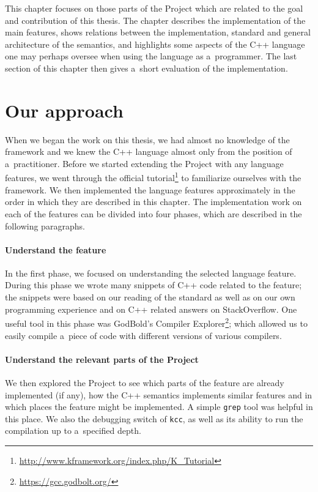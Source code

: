 \documentclass[nolot,nolof,nocover,printed]{fithesis3}
\newcommand{\kcc}{\texttt{kcc}\xspace}
\newcommand{\Project}{Project\xspace}
\begin{document}
This chapter focuses on those parts of the Project which are related to the goal and contribution of this thesis. The chapter describes the implementation of the main features, shows relations between the implementation, standard and general architecture of the semantics, and highlights some aspects of the C++ language one may perhaps oversee when using the language as a~programmer. The last section of this chapter then gives a~short evaluation of the implementation.

\section{Our approach}

When we began the work on this thesis, we had almost no knowledge of the \K framework and we knew the C++ language almost only from the position of a~practitioner. Before we started extending the \Project with any language features, we went through the official \K tutorial\footnote{\url{http://www.kframework.org/index.php/K_Tutorial}} to familiarize ourselves with the framework. We then implemented the language features approximately in the order in which they are described in this chapter. The implementation work on each of the features can be divided into four phases, which are described in the following paragraphs.

\paragraph{Understand the feature} In the first phase, we focused on understanding the selected language feature. During this phase we wrote many snippets of C++ code related to the feature; the snippets were based on our reading of the standard as well as on our own programming experience and on C++ related answers on StackOverflow. One useful tool in this phase was GodBold's Compiler Explorer\footnote{\url{https://gcc.godbolt.org/}}; which allowed us to easily compile a~piece of code with different versions of various compilers.

\paragraph{Understand the relevant parts of the \Project} We then explored the \Project to see which parts of the feature are already implemented (if any), how the C++ semantics implements similar features and in which places the feature might be implemented. A simple \texttt{grep} tool was helpful in this place. We also the debugging switch of \kcc , as well as its ability to run the compilation up to a~specified depth.
\end{document}
